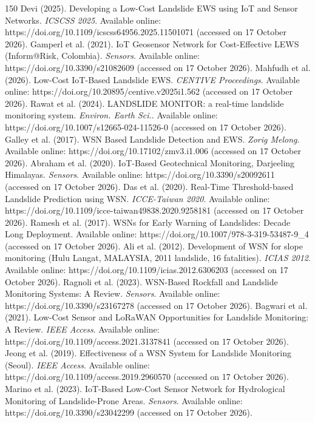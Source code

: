 \begin{thebibliography}{150}
Devi (2025). Developing a Low-Cost Landslide EWS using IoT and Sensor Networks. \textit{ICSCSS 2025}. Available online: https://doi.org/10.1109/icscss64956.2025.11501071 (accessed on 17 October 2026).
Gamperl et al. (2021). IoT Geosensor Network for Cost-Effective LEWS (Inform@Risk, Colombia). \textit{Sensors}. Available online: https://doi.org/10.3390/s21082609 (accessed on 17 October 2026).
Mahfudh et al. (2026). Low-Cost IoT-Based Landslide EWS. \textit{CENTIVE Proceedings}. Available online: https://doi.org/10.20895/centive.v2025i1.562 (accessed on 17 October 2026).
Rawat et al. (2024). LANDSLIDE MONITOR: a real-time landslide monitoring system. \textit{Environ. Earth Sci.}. Available online: https://doi.org/10.1007/s12665-024-11526-0 (accessed on 17 October 2026).
Galley et al. (2017). WSN Based Landslide Detection and EWS. \textit{Zorig Melong}. Available online: https://doi.org/10.17102/zmv3.i1.006 (accessed on 17 October 2026).
Abraham et al. (2020). IoT-Based Geotechnical Monitoring, Darjeeling Himalayas. \textit{Sensors}. Available online: https://doi.org/10.3390/s20092611 (accessed on 17 October 2026).
Das et al. (2020). Real-Time Threshold-based Landslide Prediction using WSN. \textit{ICCE-Taiwan 2020}. Available online: https://doi.org/10.1109/icce-taiwan49838.2020.9258181 (accessed on 17 October 2026).
Ramesh et al. (2017). WSNs for Early Warning of Landslides: Decade Long Deployment. Available online: https://doi.org/10.1007/978-3-319-53487-9\_4 (accessed on 17 October 2026).
Ali et al. (2012). Development of WSN for slope monitoring (Hulu Langat, MALAYSIA, 2011 landslide, 16 fatalities). \textit{ICIAS 2012}. Available online: https://doi.org/10.1109/icias.2012.6306203 (accessed on 17 October 2026).
Ragnoli et al. (2023). WSN-Based Rockfall and Landslide Monitoring Systems: A Review. \textit{Sensors}. Available online: https://doi.org/10.3390/s23167278 (accessed on 17 October 2026).
Bagwari et al. (2021). Low-Cost Sensor and LoRaWAN Opportunities for Landslide Monitoring: A Review. \textit{IEEE Access}. Available online: https://doi.org/10.1109/access.2021.3137841 (accessed on 17 October 2026).
Jeong et al. (2019). Effectiveness of a WSN System for Landslide Monitoring (Seoul). \textit{IEEE Access}. Available online: https://doi.org/10.1109/access.2019.2960570 (accessed on 17 October 2026).
Marino et al. (2023). IoT-Based Low-Cost Sensor Network for Hydrological Monitoring of Landslide-Prone Areas. \textit{Sensors}. Available online: https://doi.org/10.3390/s23042299 (accessed on 17 October 2026).

\end{thebibliography}
